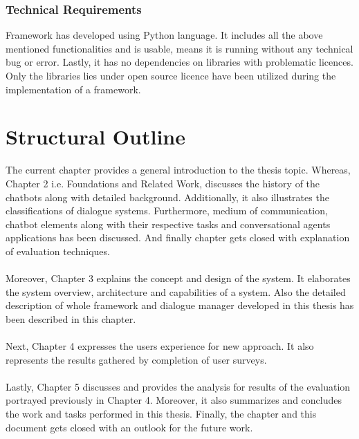 \subsubsection*{Technical Requirements}
Framework has developed using Python language. It includes all the above mentioned functionalities and is usable, means it is running without any technical bug or error. Lastly, it has no dependencies on libraries with problematic licences. Only the libraries lies under open source licence have been utilized during the implementation of a framework.

\section{Structural Outline}
The current chapter provides a general introduction to the thesis topic. Whereas, Chapter 2 i.e. Foundations and Related Work, discusses the history of the chatbots along with detailed background. Additionally, it also illustrates the classifications of dialogue systems. Furthermore, medium of communication, chatbot elements along with their respective tasks and conversational agents applications has been discussed. And finally chapter gets closed with explanation of evaluation techniques. 
\\~\\
Moreover, Chapter 3 explains the concept and design of the system. It elaborates the system overview, architecture and capabilities of a system. Also the detailed description of whole framework and dialogue manager developed in this thesis has been described in this chapter.
\\~\\
Next, Chapter 4 expresses the users experience for new approach. It also represents the results gathered by completion of user surveys.
\\~\\
Lastly, Chapter 5 discusses and provides the analysis for results of the evaluation portrayed previously in Chapter 4. Moreover, it also summarizes and concludes the work and tasks performed in this thesis. Finally, the chapter and this document gets closed with an outlook for the future work.

